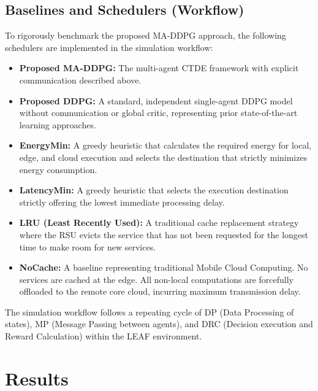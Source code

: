 \documentclass[12pt,a4paper]{report}
\begin{document}
\section{Baselines and Schedulers (Workflow)}
To rigorously benchmark the proposed MA-DDPG approach, the following schedulers are implemented in the simulation workflow:
\begin{itemize}
    \item \textbf{Proposed MA-DDPG:} The multi-agent CTDE framework with explicit communication described above.
    \item \textbf{Proposed DDPG:} A standard, independent single-agent DDPG model without communication or global critic, representing prior state-of-the-art learning approaches.
    \item \textbf{EnergyMin:} A greedy heuristic that calculates the required energy for local, edge, and cloud execution and selects the destination that strictly minimizes energy consumption.
    \item \textbf{LatencyMin:} A greedy heuristic that selects the execution destination strictly offering the lowest immediate processing delay.
    \item \textbf{LRU (Least Recently Used):} A traditional cache replacement strategy where the RSU evicts the service that has not been requested for the longest time to make room for new services.
    \item \textbf{NoCache:} A baseline representing traditional Mobile Cloud Computing. No services are cached at the edge. All non-local computations are forcefully offloaded to the remote core cloud, incurring maximum transmission delay.
\end{itemize}

The simulation workflow follows a repeating cycle of DP (Data Processing of states), MP (Message Passing between agents), and DRC (Decision execution and Reward Calculation) within the LEAF environment.


\chapter{Results}
\end{document}
